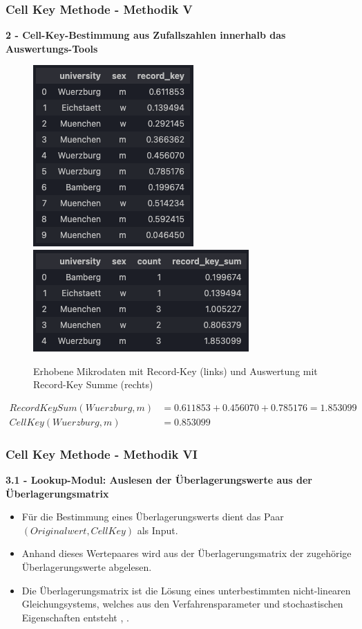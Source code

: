 \documentclass[aspectratio=169]{beamer}
\begin{document}
\begin{frame}{}
	\frametitle{Cell Key Methode - Methodik V}
    \textbf{2 - Cell-Key-Bestimmung aus Zufallszahlen innerhalb das Auswertungs-Tools} 
    \begin{figure}
		\centering
		\includegraphics[width=0.25\linewidth]{img/ckm_3.png}
        \includegraphics[width=0.3\linewidth]{img/ckm_4.png}
        \caption{Erhobene Mikrodaten mit Record-Key (links) und Auswertung mit Record-Key Summe (rechts)}
	\end{figure} 
    \begin{align*}
        RecordKeySum(Wuerzburg, m) & = 0.611853 + 0.456070 + 0.785176 = 1.853099 \\
        CellKey(Wuerzburg, m) & = 0.853099
    \end{align*}
\end{frame}


\begin{frame}{}
	\frametitle{Cell Key Methode - Methodik VI}
    \textbf{3.1 - Lookup-Modul:  Auslesen der Überlagerungswerte aus der Überlagerungsmatrix}
    \begin{itemize}
        \item Für die Bestimmung eines Überlagerungswerts dient das Paar $(Originalwert, CellKey)$ als Input.
        \item Anhand dieses Wertepaares wird aus der Überlagerungsmatrix der zugehörige Überlagerungswerte abgelesen.
        \item Die Überlagerungsmatrix ist die Lösung eines unterbestimmten nicht-linearen Gleichungsystems, welches aus den Verfahrensparameter und stochastischen Eigenschaften entsteht \cite{Höhne}, \cite{Enderle}.
    \end{itemize}
\end{frame}
\end{document}
